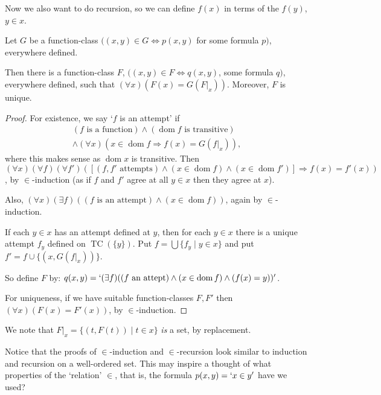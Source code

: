 \documentclass[a4paper, 10pt, twocolumn]{amsart}
\newcommand{\dom}{\operatorname{dom}}
\begin{document}
Now we also want to do recursion, so we can define $f(x)$ in terms of the $f(y)$, $y \in x$.

\begin{theorem}
Let $G$ be a function-class $((x, y) \in G \Leftrightarrow p(x, y)$ for some formula $p)$, everywhere defined.

Then there is a function-class $F$, $((x, y) \in F \Leftrightarrow q(x, y)$, some formula $q)$, everywhere defined, such that $(\forall x)(F(x) = G(\left.F\right|_x))$. Moreover, $F$ is unique.
\end{theorem}
\begin{proof}
  For existence, we say `$f$ is an attempt' if
  \begin{align*}
    (f\text{ is a function}) \land (\dom f\text{ is transitive}) \\
    \land (\forall x)(x \in \dom f \Rightarrow f(x) = G(\left.f\right|_x)),
  \end{align*}
  where this makes sense as $\dom x$ is transitive.
  Then $(\forall x)(\forall f)(\forall f')([(f, f'\text{ attempts}) \land (x \in \dom f) \land (x \in \dom f')]\Rightarrow f(x) = f'(x))$, by $\in$-induction (as if $f$ and $f'$ agree at all $y \in x$ then they agree at $x$).

  Also, $(\forall x)(\exists f)((f \text{ is an attempt}) \land (x \in \dom f))$, again by $\in$-induction.

  If each $y \in x$ has an attempt defined at $y$, then for each $y \in x$ there is a unique attempt $f_y$ defined on $\operatorname{TC}(\{y\})$. Put $f = \bigcup\{f_y \mid y \in x\}$ and put $f' = f \cup \{(x, G(\left.f\right|_x))\}$.

  So define $F$ by: $q(x, y) = `(\exists f)((f\text{ an attept}) \land (x \in \dom f) \land (f(x) = y))'$.
  
  For uniqueness, if we have suitable function-classes $F, F'$ then $(\forall x)(F(x) = F'(x))$, by $\in$-induction.
\end{proof}

\begin{remark}
  We note that $\left.F\right|_x = \{(t, F(t)) \mid t \in x\}$ \emph{is} a set, by replacement.
\end{remark}

Notice that the proofs of $\in$-induction and $\in$-recursion look similar to induction and recursion on a well-ordered set. This may inspire a thought of what properties of the `relation' $\in$, that is, the formula $p(x, y) = `x \in y'$ have we used? 
\end{document}
